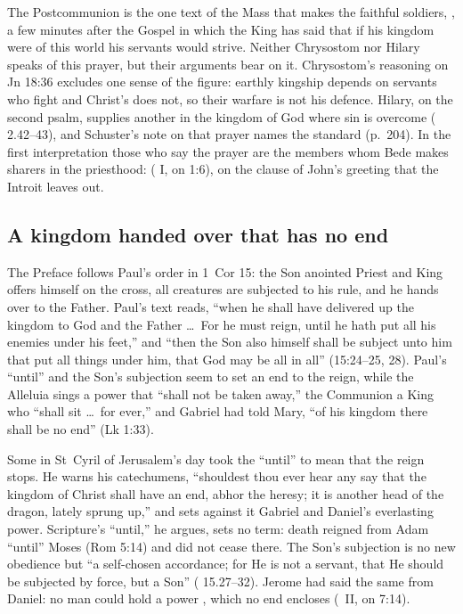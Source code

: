 The Postcommunion is the one text of the Mass that makes the faithful
soldiers, , a few minutes after the Gospel in which the King has said that if
his kingdom were of this world his servants would strive. Neither Chrysostom
nor Hilary speaks of this prayer, but their arguments bear on it. Chrysostom's
reasoning on Jn 18:36 excludes one sense of the figure: earthly kingship
depends on servants who fight and Christ's does not, so their warfare is not
his defence. Hilary, on the second psalm, supplies another in the kingdom of
God where sin is overcome ( 2.42--43), and
Schuster's note on that prayer names the standard (p.~204). In the first interpretation those who say
the prayer are the members whom Bede makes sharers in the priesthood:  ( I, on 1:6), on the clause of John's greeting that the Introit
leaves out.

\subsection{A kingdom handed over that has no end}

The Preface follows Paul's order in 1~Cor 15: the Son anointed Priest and
King offers himself on the cross, all creatures are subjected to his rule,
and he hands over  to the Father. Paul's
text reads, ``when he shall have delivered up the kingdom
to God and the Father \dots\ For he must reign, until he hath put all his
enemies under his feet,'' and ``then the Son also himself shall be subject
unto him that put all things under him, that God may be all in all''
(15:24--25, 28). Paul's ``until'' and the Son's subjection seem to set an
end to the reign, while the Alleluia sings a power that ``shall not be
taken away,'' the Communion a King who ``shall sit \dots\ for ever,'' and
Gabriel had told Mary, ``of his kingdom there shall be no end'' (Lk 1:33).

Some in St~Cyril of Jerusalem's day took the ``until'' to mean that the reign
stops. He warns his catechumens, ``shouldest thou ever hear any say that the
kingdom of Christ shall have an end, abhor the heresy; it is another head of
the dragon, lately sprung up,'' and sets against it Gabriel and Daniel's
everlasting power. Scripture's ``until,'' he argues, sets no term: death
reigned from Adam ``until'' Moses (Rom 5:14) and did not cease there. The Son's
subjection is no new obedience but ``a self-chosen accordance; for He is not a
servant, that He should be subjected by force, but a Son''
( 15.27--32). Jerome had said the same from
Daniel: no man could hold a power , which no
end encloses (\ II, on 7:14).

